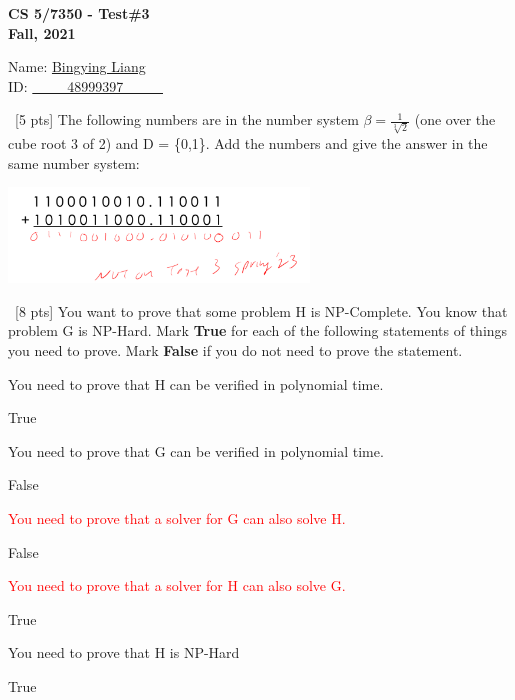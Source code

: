 \documentclass[12pt]{article}
\newenvironment{sol}[1][Solution]{\begin{trivlist}\item[\hskip\labelsep {\bfseries #1:}]}{\end{trivlist}}
\begin{document}
\renewcommand{\qedsymbol}{\filledbox}
\begin{center}
    \textbf{CS 5/7350 - Test\#3} \\
    \textbf{Fall, 2021}
\end{center}
\begin{flushright}
Name: \underline{Bingying Liang }\\
ID:  \underline{\ \ \ \ \ 48999397 \ \ \ \ \ }
\end{flushright}
\begin{enumerate}
    \item \ [5 pts] The following numbers are in the number system $\beta= \frac{1}{\sqrt[3]{2}}$ (one over the cube root 3
of 2) and D = \{0,1\}. Add the numbers and give the answer in the same number system:
\begin{sol}
\hspace*{\fill}
            \begin{center}
    \includegraphics[width=0.6\textwidth]{p1.png}
    \end{center} 
\end{sol}

\item \ [8 pts] You want to prove that some problem H is NP-Complete. You know that problem G is NP-Hard. Mark \textbf{True} for each of the following statements of things you need to prove. Mark \textbf{False} if you do not need to prove the statement.
    \begin{enumerate}
        \item You need to prove that H can be verified in polynomial time.
        \begin{sol}
            True
        \end{sol}
        \item You need to prove that G can be verified in polynomial time.
        \begin{sol}
            False
        \end{sol}
        \item \textcolor{red}{You need to prove that a solver for G can also solve H.}
        \begin{sol}
            False
        \end{sol}
        \item \textcolor{red}{You need to prove that a solver for H can also solve G.}
        \begin{sol}
            True
        \end{sol}
        \item You need to prove that H is NP-Hard
        \begin{sol}
            True
        \end{sol}
    \end{enumerate}


\end{enumerate}
\end{document}
